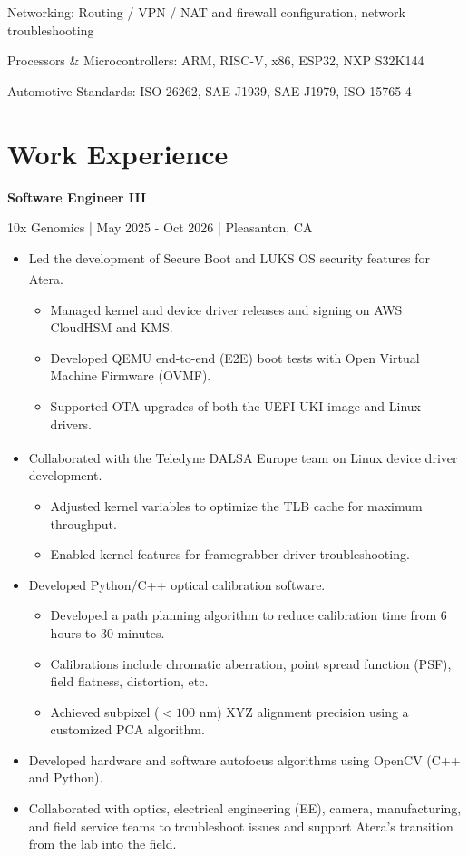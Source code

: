 \documentclass[11pt,a4paper]{article}
\newcommand{\resumejob}[4]{%
  \par\addvspace{7pt}%
  \textbf{#1}\par\nopagebreak
  #2 | #3 | #4\par\nopagebreak
}
\newcommand{\resumeskill}[2]{{\resumesemibold #1:} #2\par}
\begin{document}
\resumeskill{Networking}{Routing / VPN / NAT and firewall configuration, network troubleshooting}

\resumeskill{Processors \& Microcontrollers}{ARM, RISC-V, x86, ESP32, NXP S32K144}

\resumeskill{Automotive Standards}{ISO 26262, SAE J1939, SAE J1979, ISO 15765-4}

\section*{Work Experience}

\resumejob{Software Engineer III}{10x Genomics}{May 2025 - Oct 2026}{Pleasanton, CA}
\begin{itemize}
  \item Led the development of Secure Boot and LUKS OS security features for Atera\textsuperscript{\textregistered}.
  \begin{itemize}
    \item Managed kernel and device driver releases and signing on AWS CloudHSM and KMS.
    \item Developed QEMU end-to-end (E2E) boot tests with Open Virtual Machine Firmware (OVMF).
    \item Supported OTA upgrades of both the UEFI UKI image and Linux drivers.
  \end{itemize}
  \item Collaborated with the Teledyne DALSA\textsuperscript{\textregistered} Europe team on Linux device driver development.
  \begin{itemize}
    \item Adjusted kernel variables to optimize the TLB cache for maximum throughput.
    \item Enabled kernel features for framegrabber driver troubleshooting.
  \end{itemize}
  \item Developed Python/C++ optical calibration software.
  \begin{itemize}
    \item Developed a path planning algorithm to reduce calibration time from 6 hours to 30 minutes.
    \item Calibrations include chromatic aberration, point spread function (PSF), field flatness, distortion, etc.
    \item Achieved subpixel ($<100$ nm) XYZ alignment precision using a customized PCA algorithm.
  \end{itemize}
  \item Developed hardware and software autofocus algorithms using OpenCV (C++ and Python).
  \item Collaborated with optics, electrical engineering (EE), camera, manufacturing, and field service teams to troubleshoot issues and support Atera's transition from the lab into the field.
\end{itemize}
\end{document}
